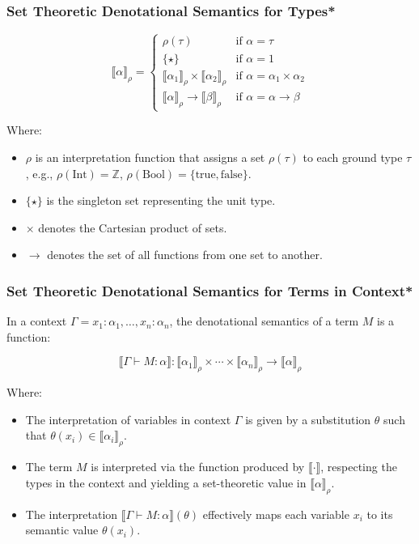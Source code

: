 \documentclass[aspectratio=169]{beamer}
\begin{document}
\begin{frame}
\frametitle{Set Theoretic Denotational Semantics for Types*}

\[
\llbracket \alpha \rrbracket_\rho =
\begin{cases}
\rho(\tau) & \text{if } \alpha = \tau \\
\{\star\} & \text{if } \alpha = 1 \\
\llbracket \alpha_1 \rrbracket_\rho \times \llbracket \alpha_2 \rrbracket_\rho & \text{if } \alpha = \alpha_1 \times \alpha_2 \\
\llbracket \alpha \rrbracket_\rho \rightarrow \llbracket \beta \rrbracket_\rho & \text{if } \alpha = \alpha \rightarrow \beta
\end{cases}
\]

Where:
\begin{itemize}
    \item $\rho$ is an interpretation function that assigns a set $\rho(\tau)$ to each ground type $\tau$, e.g., $\rho(\text{Int}) = \mathbb{Z}$, $\rho(\text{Bool}) = \{ \text{true}, \text{false} \}$.
    \item $\{\star\}$ is the singleton set representing the unit type.
    \item $\times$ denotes the Cartesian product of sets.
    \item $\rightarrow$ denotes the set of all functions from one set to another.
\end{itemize}
\end{frame}

\begin{frame}
\frametitle{Set Theoretic Denotational Semantics for Terms in Context*}

In a context $\Gamma = x_1 : \alpha_1, \ldots, x_n : \alpha_n$, the denotational semantics of a term $M$ is a function:

\[
\llbracket \Gamma \vdash M : \alpha \rrbracket : \llbracket \alpha_1 \rrbracket_\rho \times \cdots \times \llbracket \alpha_n \rrbracket_\rho \to \llbracket \alpha \rrbracket_\rho
\]

Where:
\begin{itemize}
    \item The interpretation of variables in context $\Gamma$ is given by a substitution $\theta$ such that $\theta(x_i) \in \llbracket \alpha_i \rrbracket_\rho$.
    \item The term $M$ is interpreted via the function produced by $\llbracket \cdot \rrbracket$, respecting the types in the context and yielding a set-theoretic value in $\llbracket \alpha \rrbracket_\rho$.
    \item The interpretation $\llbracket \Gamma \vdash M : \alpha \rrbracket(\theta)$ effectively maps each variable $x_i$ to its semantic value $\theta(x_i)$.
\end{itemize}
\end{frame}
\end{document}
